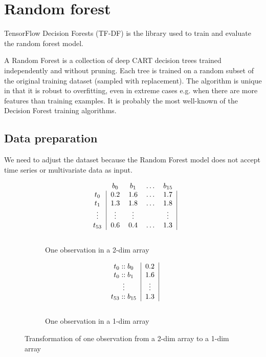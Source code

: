 \section{Random forest}

TensorFlow Decision Forests (TF-DF) \cite{TensorFlow:rf} is the library used to train and evaluate the random forest model.

A Random Forest \cite{breiman2001random} is a collection of deep CART decision trees trained independently and without pruning.
Each tree is trained on a random subset of the original training dataset (sampled with replacement).
The algorithm is unique in that it is robust to overfitting, even in extreme cases e.g. when there are more features than training examples.
It is probably the most well-known of the Decision Forest training algorithms.

\subsection{Data preparation}
We need to adjust the dataset because the Random Forest model does not accept time series or multivariate data as input.

\begin{figure}[H]
  \begin{subfigure}{.49\textwidth}
    \centering
    \[
      \begin{blockarray}{ccccc}
        & b_0 & b_1 & \dots & b_{15} \\
        \begin{block}{c|cccc|}
          t_0 & 0.2 & 1.6 & \dots & 1.7  \\
          t_1 & 1.3 & 1.8 & \dots & 1.8 \\
          \vdots & \vdots & \vdots &  & \vdots   \\
          t_{53} & 0.6 & 0.4 & \dots & 1.3 \\
        \end{block}
      \end{blockarray}
    \]
    \caption{One observation in a 2-dim array}
    \label{fig:figtrans1}
  \end{subfigure}
  \begin{subfigure}{.49\textwidth}
    \centering
    \[
      \begin{blockarray}{cc}
      \begin{block}{c|c|}
        t_0::b_0 & 0.2 \\
        t_0::b_1 & 1.6 \\
        \vdots & \vdots \\
        t_{53}::b_{15} & 1.3 \\
      \end{block}
      \end{blockarray}
    \]
    \caption{One observation in a 1-dim array}
    \label{fig:figtrans2}
  \end{subfigure}
  \caption{Transformation of one observation from a 2-dim array to a 1-dim array}
  \label{fig:figtrans}
\end{figure}

